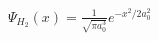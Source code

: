 \documentclass[preview]{standalone}
\begin{document}
\begin{center}
$\Psi_{H_2}(x) = \frac{1}{\sqrt{\pi a_0^3}} e^{-x^2/2a_0^2} $
\end{center}
\end{document}
